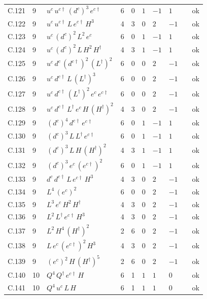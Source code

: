 {\begin{longtable}{@{}ll>{\raggedright\arraybackslash}p{6.4cm}rrllllr@{}}
C.121 & 9 & $u^c\,u^{c\dagger}\,(d^c)^{3}\,e^{c\dagger}$ & 6 & 0 & $1$ & $-1$ & $1$ &  & ok \\
C.122 & 9 & $u^c\,u^{c\dagger}\,L\,e^{c\dagger}\,H^{3}$ & 4 & 3 & $0$ & $2$ & $-1$ &  & ok \\
C.123 & 9 & $u^c\,(d^c)^{2}\,L^{2}\,e^c$ & 6 & 0 & $1$ & $-1$ & $1$ &  & ok \\
C.124 & 9 & $u^c\,(d^c)^{2}\,L\,H^{2}\,H^\dagger$ & 4 & 3 & $1$ & $-1$ & $1$ &  & ok \\
C.125 & 9 & $u^c\,d^c\,(d^{c\dagger})^{2}\,(L^\dagger)^{2}$ & 6 & 0 & $0$ & $2$ & $-1$ &  & ok \\
C.126 & 9 & $u^c\,d^{c\dagger}\,L\,(L^\dagger)^{3}$ & 6 & 0 & $0$ & $2$ & $-1$ &  & ok \\
C.127 & 9 & $u^c\,d^{c\dagger}\,(L^\dagger)^{2}\,e^c\,e^{c\dagger}$ & 6 & 0 & $0$ & $2$ & $-1$ &  & ok \\
C.128 & 9 & $u^c\,d^{c\dagger}\,L^\dagger\,e^c\,H\,(H^\dagger)^{2}$ & 4 & 3 & $0$ & $2$ & $-1$ &  & ok \\
C.129 & 9 & $(d^c)^{4}\,d^{c\dagger}\,e^{c\dagger}$ & 6 & 0 & $1$ & $-1$ & $1$ &  & ok \\
C.130 & 9 & $(d^c)^{3}\,L\,L^\dagger\,e^{c\dagger}$ & 6 & 0 & $1$ & $-1$ & $1$ &  & ok \\
C.131 & 9 & $(d^c)^{3}\,L\,H\,(H^\dagger)^{2}$ & 4 & 3 & $1$ & $-1$ & $1$ &  & ok \\
C.132 & 9 & $(d^c)^{3}\,e^c\,(e^{c\dagger})^{2}$ & 6 & 0 & $1$ & $-1$ & $1$ &  & ok \\
C.133 & 9 & $d^c\,d^{c\dagger}\,L\,e^{c\dagger}\,H^{3}$ & 4 & 3 & $0$ & $2$ & $-1$ &  & ok \\
C.134 & 9 & $L^{4}\,(e^c)^{2}$ & 6 & 0 & $0$ & $2$ & $-1$ &  & ok \\
C.135 & 9 & $L^{3}\,e^c\,H^{2}\,H^\dagger$ & 4 & 3 & $0$ & $2$ & $-1$ &  & ok \\
C.136 & 9 & $L^{2}\,L^\dagger\,e^{c\dagger}\,H^{3}$ & 4 & 3 & $0$ & $2$ & $-1$ &  & ok \\
C.137 & 9 & $L^{2}\,H^{4}\,(H^\dagger)^{2}$ & 2 & 6 & $0$ & $2$ & $-1$ &  & ok \\
C.138 & 9 & $L\,e^c\,(e^{c\dagger})^{2}\,H^{3}$ & 4 & 3 & $0$ & $2$ & $-1$ &  & ok \\
C.139 & 9 & $(e^c)^{2}\,H\,(H^\dagger)^{5}$ & 2 & 6 & $0$ & $2$ & $-1$ &  & ok \\
C.140 & 10 & $Q^{4}\,Q^\dagger\,e^{c\dagger}\,H$ & 6 & 1 & $1$ & $1$ & $0$ &  & ok \\
C.141 & 10 & $Q^{4}\,u^c\,L\,H$ & 6 & 1 & $1$ & $1$ & $0$ &  & ok \\

\end{longtable}}
